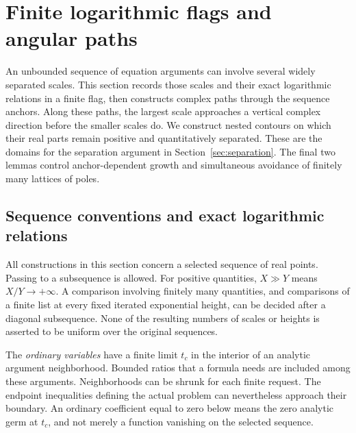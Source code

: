 \section{Finite logarithmic flags and angular paths}\label{sec:flags}

An unbounded sequence of equation arguments can involve several widely
separated scales. This section records those scales and their exact
logarithmic relations in a finite flag, then constructs complex paths
through the sequence anchors. Along these paths, the largest scale
approaches a vertical complex direction before the smaller scales do.
We construct nested contours on which their real parts remain positive
and quantitatively separated. These are the domains for the separation
argument in Section~\ref{sec:separation}. The final two lemmas control
anchor-dependent growth and simultaneous avoidance of finitely many
lattices of poles.


\subsection{Sequence conventions and exact logarithmic relations}

All constructions in this section concern a selected sequence of real
points. Passing to a subsequence is allowed. For positive quantities,
$X\gg Y$ means $X/Y\to+\infty$. A comparison involving finitely many
quantities, and comparisons of a finite list at every fixed iterated
exponential height, can be decided after a diagonal subsequence. None of
the resulting numbers of scales or heights is asserted to be uniform
over the original sequences.

The \emph{ordinary variables} have a finite limit $t_c$ in the interior of
an analytic argument neighborhood. Bounded ratios that a formula needs
are included among these arguments. Neighborhoods can be shrunk for
each finite request. The endpoint inequalities defining the actual
problem can nevertheless approach their boundary. An ordinary
coefficient equal to zero below means the zero analytic germ at $t_c$,
and not merely a function vanishing on the selected sequence.


